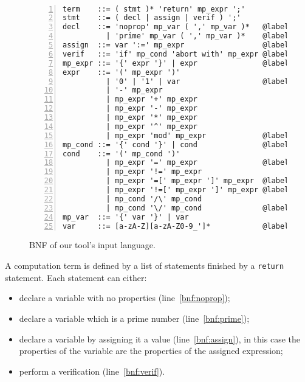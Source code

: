 \documentclass[10pt]{article}
\theoremstyle{definition}
\theoremstyle{theorem}
\begin{document}
\begin{figure}
\begin{minipage}[c]{\linewidth}
\begin{minipage}[c]{0.1\linewidth}
~
\end{minipage}
\begin{minipage}[c]{0.85\linewidth}
{\smaller
\begin{Verbatim}[commandchars=@~&,numbers=left]
term    ::= ( stmt )* 'return' mp_expr ';'
stmt    ::= ( decl | assign | verif ) ';'
decl    ::= 'noprop' mp_var ( ',' mp_var )*   @label~bnf:noprop&
          | 'prime' mp_var ( ',' mp_var )*    @label~bnf:prime&
assign  ::= var ':=' mp_expr                  @label~bnf:assign&
verif   ::= 'if' mp_cond 'abort with' mp_expr @label~bnf:verif&
mp_expr ::= '{' expr '}' | expr               @label~bnf:mpe&
expr    ::= '(' mp_expr ')'
          | '0' | '1' | var                   @label~bnf:expr1&
          | '-' mp_expr
          | mp_expr '+' mp_expr
          | mp_expr '-' mp_expr
          | mp_expr '*' mp_expr
          | mp_expr '^' mp_expr
          | mp_expr 'mod' mp_expr             @label~bnf:expr2&
mp_cond ::= '{' cond '}' | cond               @label~bnf:mpc&
cond    ::= '(' mp_cond ')'
          | mp_expr '=' mp_expr               @label~bnf:cond1&
          | mp_expr '!=' mp_expr
          | mp_expr '=[' mp_expr ']' mp_expr  @label~bnf:eqmod&
          | mp_expr '!=[' mp_expr ']' mp_expr @label~bnf:neqmod&
          | mp_cond '/\' mp_cond
          | mp_cond '\/' mp_cond              @label~bnf:cond2&
mp_var  ::= '{' var '}' | var
var     ::= [a-zA-Z][a-zA-Z0-9_']*            @label~bnf:var&
\end{Verbatim}
}
\caption{\label{bnf} BNF of our tool's input language.}
\end{minipage}
\end{minipage}
\end{figure}

A computation term is defined by a list of statements finished by a {\tt return} statement.
Each statement can either:
\begin{itemize}
\item declare a variable with no properties (line~\ref{bnf:noprop});
\item declare a variable which is a prime number (line~\ref{bnf:prime});
\item declare a variable by assigning it a value (line~\ref{bnf:assign}), in this case the properties of the variable are the properties of the assigned expression;
\item perform a verification (line~\ref{bnf:verif}).
\end{itemize}
\end{document}
